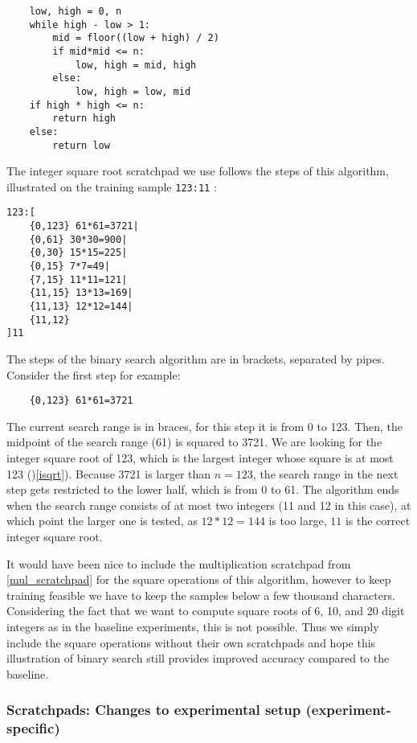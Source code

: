 \begin{lstlisting}
    low, high = 0, n
    while high - low > 1:
        mid = floor((low + high) / 2)
        if mid*mid <= n:
            low, high = mid, high
        else:
            low, high = low, mid 
    if high * high <= n:
        return high
    else:
        return low
\end{lstlisting}

\noindent
The integer square root scratchpad we use follows the steps of this algorithm, illustrated on the training sample \verb|123:11| :

\begin{lstlisting}
123:[
    {0,123} 61*61=3721| 
    {0,61} 30*30=900|
    {0,30} 15*15=225|
    {0,15} 7*7=49|
    {7,15} 11*11=121|
    {11,15} 13*13=169|
    {11,13} 12*12=144|
    {11,12}
]11
\end{lstlisting}

The steps of the binary search algorithm are in brackets, separated by pipes.
Consider the first step for example:

\begin{lstlisting}
	{0,123} 61*61=3721
\end{lstlisting}

The current search range is in braces, for this step it is from 0 to 123.
Then, the midpoint of the search range (61) is squared to 3721.
We are looking for the integer square root of 123, which is the largest integer whose square is at most 123 ()\cref{isqrt}). Because 3721 is larger than $n=123$, the search range in the next step gets restricted to the lower half, which is from 0 to 61.
The algorithm ends when the search range consists of at most two integers (11 and 12 in this case), at which point the larger one is tested, as $12*12=144$ is too large, $11$ is the correct integer square root.


It would have been nice to include the multiplication scratchpad from \cref{mul_scratchpad} for the square operations of this algorithm, however to keep training feasible we have to keep the samples below a few thousand characters. Considering the fact that we want to compute square roots of 6, 10, and 20 digit integers as in the baseline experiments, this is not possible.
Thus we simply include the square operations without their own scratchpads and hope this illustration of binary search still provides improved accuracy compared to the baseline.


\subsubsection{Scratchpads: Changes to experimental setup (experiment-specific)}
\label{scratchpad_changes}

